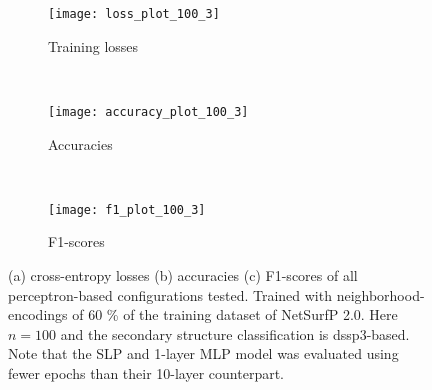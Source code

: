 \begin{figure}[H]
        \centering
        \begin{minipage}[b]{.6\textwidth}
            \begin{subfigure}[b]{\textwidth}
            \texttt{[image: loss\_plot\_100\_3]}
            \caption{Training losses}
            \label{fig:loss}
        \end{subfigure}
        \end{minipage}
        \\
        \centering
        \begin{minipage}[b]{.6\textwidth}
        \begin{subfigure}[b]{\textwidth}
            \texttt{[image: accuracy\_plot\_100\_3]}
            \caption{Accuracies}
            \label{fig:accuracy}
        \end{subfigure}
        \end{minipage}
        \\
        \centering
        \begin{minipage}[b]{.6\textwidth}
        \begin{subfigure}[b]{\textwidth}
            \texttt{[image: f1\_plot\_100\_3]}
            \caption{F1-scores}\label{fig:f1}
        \end{subfigure}
        \end{minipage}
        \caption{(a) cross-entropy losses (b) accuracies (c) F1-scores of all perceptron-based configurations tested. Trained with neighborhood-encodings of 60 \% of the training dataset of NetSurfP 2.0. Here $n=100$ and the secondary structure classification is dssp3-based. Note that the SLP and 1-layer MLP model was evaluated using fewer epochs than their 10-layer counterpart.}\label{fig:she3}
        \end{figure}

